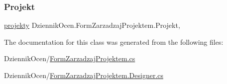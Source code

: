 \subsubsection{\texorpdfstring{Projekt}{Projekt}}
{\footnotesize\ttfamily \hyperlink{class_dziennik_ocen_1_1projekty}{projekty} Dziennik\+Ocen.\+Form\+Zarzadzaj\+Projektem.\+Projekt\hspace{0.3cm}{\ttfamily [get]}, {\ttfamily [set]}}



The documentation for this class was generated from the following files\+:\begin{DoxyCompactItemize}
\item 
Dziennik\+Ocen/\hyperlink{_form_zarzadzaj_projektem_8cs}{Form\+Zarzadzaj\+Projektem.\+cs}\item 
Dziennik\+Ocen/\hyperlink{_form_zarzadzaj_projektem_8_designer_8cs}{Form\+Zarzadzaj\+Projektem.\+Designer.\+cs}\end{DoxyCompactItemize}
